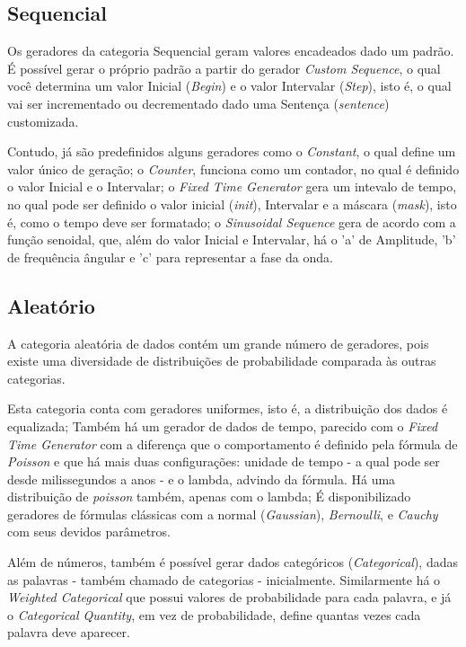\documentclass[
	12pt,				%
	openright,			%
	oneside,			%
	a4paper,			%
	english,			%
	brazil				%
	]{abntex2}
\begin{document}
		\subsection{Sequencial}
			Os geradores da categoria Sequencial geram valores encadeados dado um padrão.
			É possível gerar o próprio padrão a partir do gerador \emph{Custom Sequence}, o qual você determina um valor Inicial (\emph{Begin}) e o valor Intervalar (\emph{Step}), isto é, o qual vai ser incrementado ou decrementado dado uma Sentença (\emph{sentence}) customizada.
			\par
			Contudo, já são predefinidos alguns geradores como 
				o \emph{Constant}, o qual define um valor único de geração;
				o \emph{Counter}, funciona como um contador, no qual é definido o valor Inicial e o Intervalar;
				o \emph{Fixed Time Generator} gera um intevalo de tempo, no qual pode ser definido o valor inicial (\emph{init}), Intervalar e a máscara (\emph{mask}), isto é, como o tempo deve ser formatado;
				o \emph{Sinusoidal Sequence} gera de acordo com a função senoidal, que, além do valor Inicial e Intervalar, há o 'a' de Amplitude, 'b' de frequência ângular e 'c' para representar a fase da onda.

		\subsection{Aleatório}
			A categoria aleatória de dados contém um grande número de geradores, pois existe uma diversidade de distribuições de probabilidade comparada às outras categorias.
			\par
			Esta categoria conta com geradores uniformes, isto é, a distribuição dos dados é equalizada;
				Também há um gerador de dados de tempo, parecido com o \emph{Fixed Time Generator} com a diferença que o comportamento é definido pela fórmula de \emph{Poisson} e que há mais duas configurações: unidade de tempo - a qual pode ser desde milissegundos a anos - e o lambda, advindo da fórmula.
				Há uma distribuição de \emph{poisson} também, apenas com o lambda;
				É disponibilizado geradores de fórmulas clássicas com a normal (\emph{Gaussian}), \emph{Bernoulli}, e \emph{Cauchy} com seus devidos parâmetros.
			\par
			Além de números, também é possível gerar dados categóricos (\emph{Categorical}), dadas as palavras - também chamado de categorias - inicialmente.
				Similarmente há o \emph{Weighted Categorical} que possui valores de probabilidade para cada palavra, e 
				já o \emph{Categorical Quantity}, em vez de probabilidade, define quantas vezes cada palavra deve aparecer.
\end{document}
